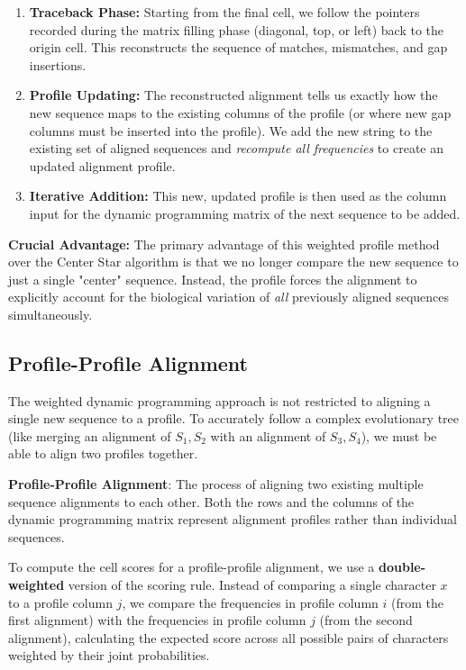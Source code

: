 \begin{enumerate}
        \item \textbf{Traceback Phase:} Starting from the final cell, we follow the pointers recorded during the matrix filling phase (diagonal, top, or left) back to the origin cell. This reconstructs the sequence of matches, mismatches, and gap insertions.
        \item \textbf{Profile Updating:} The reconstructed alignment tells us exactly how the new sequence maps to the existing columns of the profile (or where new gap columns must be inserted into the profile). We add the new string to the existing set of aligned sequences and \textit{recompute all frequencies} to create an updated alignment profile.
        \item \textbf{Iterative Addition:} This new, updated profile is then used as the column input for the dynamic programming matrix of the next sequence to be added.
\end{enumerate}

\sta \textbf{Crucial Advantage:} The primary advantage of this weighted profile method over the Center Star algorithm is that we no longer compare the new sequence to just a single "center" sequence. Instead, the profile forces the alignment to explicitly account for the biological variation of \textit{all} previously aligned sequences simultaneously.

\subsection{Profile-Profile Alignment}

The weighted dynamic programming approach is not restricted to aligning a single new sequence to a profile. To accurately follow a complex evolutionary tree (like merging an alignment of $S_1, S_2$ with an alignment of $S_3, S_4$), we must be able to align two profiles together.

\begin{important}
    \textbf{Profile-Profile Alignment}: The process of aligning two existing multiple sequence alignments to each other. Both the rows and the columns of the dynamic programming matrix represent alignment profiles rather than individual sequences.
\end{important}

To compute the cell scores for a profile-profile alignment, we use a \textbf{double-weighted} version of the scoring rule. Instead of comparing a single character $x$ to a profile column $j$, we compare the frequencies in profile column $i$ (from the first alignment) with the frequencies in profile column $j$ (from the second alignment), calculating the expected score across all possible pairs of characters weighted by their joint probabilities.

